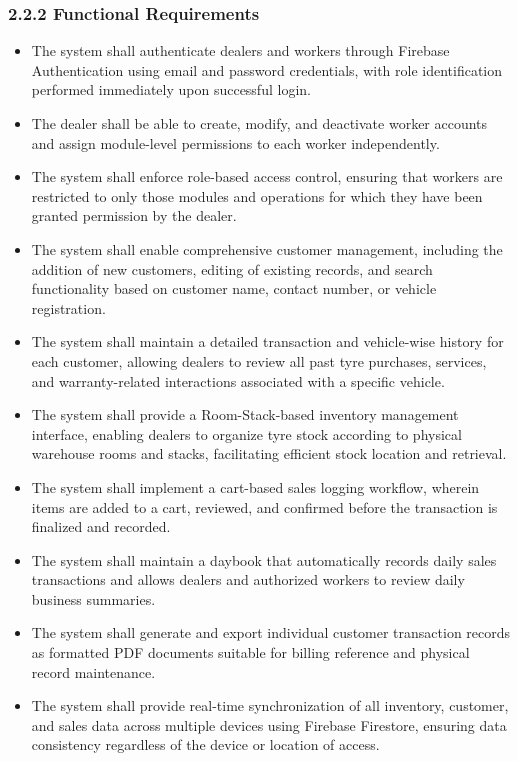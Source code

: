\documentclass[12pt, oneside]{article}
\begin{document}
\subsubsection*{2.2.2 Functional Requirements}
\begin{itemize}
    \item The system shall authenticate dealers and workers through Firebase Authentication using email and password credentials, with role identification performed immediately upon successful login.
    \item The dealer shall be able to create, modify, and deactivate worker accounts and assign module-level permissions to each worker independently.
    \item The system shall enforce role-based access control, ensuring that workers are restricted to only those modules and operations for which they have been granted permission by the dealer.
    \item The system shall enable comprehensive customer management, including the addition of new customers, editing of existing records, and search functionality based on customer name, contact number, or vehicle registration.
    \item The system shall maintain a detailed transaction and vehicle-wise history for each customer, allowing dealers to review all past tyre purchases, services, and warranty-related interactions associated with a specific vehicle.
    \item The system shall provide a Room-Stack-based inventory management interface, enabling dealers to organize tyre stock according to physical warehouse rooms and stacks, facilitating efficient stock location and retrieval.
    \item The system shall implement a cart-based sales logging workflow, wherein items are added to a cart, reviewed, and confirmed before the transaction is finalized and recorded.
    \item The system shall maintain a daybook that automatically records daily sales transactions and allows dealers and authorized workers to review daily business summaries.
    \item The system shall generate and export individual customer transaction records as formatted PDF documents suitable for billing reference and physical record maintenance.
    \item The system shall provide real-time synchronization of all inventory, customer, and sales data across multiple devices using Firebase Firestore, ensuring data consistency regardless of the device or location of access.

\end{itemize}
\end{document}
